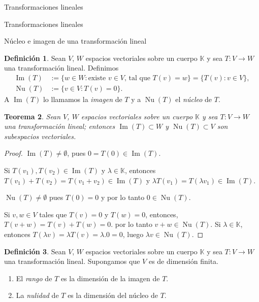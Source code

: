 \documentclass[a4paper,12pt,twoside,spanish,reqno]{amsbook}
\numberwithin{equation}{section}
\newtheorem{teorema}{Teorema}[section]
\theoremstyle{definition}
\newtheorem{definicion}[teorema]{Definici\'on}
\theoremstyle{remark}
\newcommand{\img}{\operatorname{Im}}
\newcommand{\nuc}{\operatorname{Nu}}
\newcommand{\K}{\mathbb K}
\begin{document}
\begin{chapter}{Transformaciones lineales}
\begin{section}{Transformaciones lineales}
        \end{section}\newpage
    
    
        \begin{section}{Núcleo e imagen de una transformación lineal}\label{seccion-nucleo-e-imagen-de-una-tl}
        
        \begin{definicion}
            Sean $V$, $W$ espacios vectoriales sobre un cuerpo $\K$ y sea $T:V \to W$ una transformación lineal.  Definimos
            \begin{align*}
                \img(T) &:= \{w \in W:\text{existe $v \in V$, tal que } T(v)=w\} = \{T(v): v \in V \}, \\
                \nuc(T) &:= \{v \in V: T(v)=0 \}. 
            \end{align*}
            A $\img(T)$ lo llamamos la \textit{imagen} de $T$ y a $ \nuc(T)$ el \textit{núcleo} de $T$. 
        \end{definicion}
        
        \begin{teorema}
            Sean $V$, $W$ espacios vectoriales sobre un cuerpo $\K$ y sea $T:V \to W$ una transformación lineal; entonces $\img(T) \subset W$ y $\nuc(T) \subset V$ son subespacios vectoriales.
        \end{teorema}
        \begin{proof}
            $\img(T) \ne \emptyset$, pues $0 = T(0) \in \img(T)$. 
            
            Si $T(v_1),T(v_2) \in \img(T)$ y $\lambda \in \K$,  entonces $T(v_1) + T(v_2) = T(v_1+v_2) \in \img(T)$ y $\lambda T(v_1) = T(\lambda v_1) \in \img(T)$.
            
            
            $\nuc(T) \ne \emptyset$ pues $T(0) =0$ y por lo tanto $0 \in \nuc(T)$.
            
            Si $v,w \in V$ tales que $T(v) =0$ y $T(w)=0$,  entonces, $T(v+w)= T(v)+T(w) =0$. por lo tanto $v+w \in \nuc(T)$. Si  $\lambda \in \K$,  entonces $T(\lambda v) = \lambda T(v) = \lambda.0 =0$, luego  $\lambda v \in \nuc(T)$.
        \end{proof}

    
        \begin{definicion}
            Sean $V$, $W$ espacios vectoriales sobre un cuerpo $\K$ y sea $T:V \to W$ una transformación lineal. Supongamos que $V$ es de dimensión finita.
            \begin{enumerate}
\item El \textit{rango} de $T$ es la dimensión de la imagen de $T$.
\item La \textit{nulidad} de $T$ es la dimensión del núcleo  de $T$.
            \end{enumerate}
            

\end{definicion}
\end{section}
\end{chapter}
\end{document}
